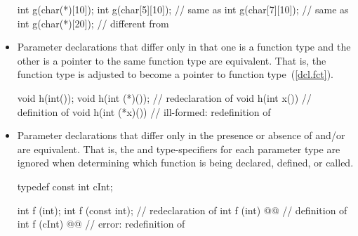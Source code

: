 \begin{note}
\begin{itemize}
\begin{example}
\begin{codeblock}
int g(char(*)[10]);
int g(char[5][10]);             // same as 
int g(char[7][10]);             // same as 
int g(char(*)[20]);             // different from 
\end{codeblock}
\end{example}

\item
{}%
%
Parameter declarations that differ only in that one is a function type
and the other is a pointer to the same function type are equivalent.
That is, the function type is adjusted to become a pointer to function type~(\ref{dcl.fct}).
\begin{example}

\begin{codeblock}
void h(int());
void h(int (*)());              // redeclaration of 
void h(int x()) { }             // definition of 
void h(int (*x)()) { }          // ill-formed: redefinition of 
\end{codeblock}
\end{example}

\item
{}%
%
Parameter declarations that differ only in the presence or absence of
and/or
are equivalent.
That is, the
and
type-specifiers for
each parameter type are ignored when determining which function is being
declared,
defined, or called.
\begin{example}

\begin{codeblock}
typedef const int cInt;

int f (int);
int f (const int);              // redeclaration of 
int f (int) @@      // definition of 
int f (cInt) @@     // error: redefinition of 
\end{codeblock}
\end{example}


\end{itemize}
\end{note}
